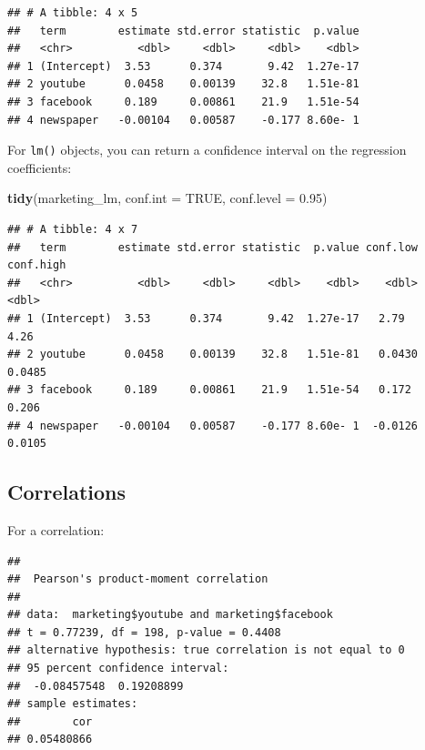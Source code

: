 \documentclass[
]{book}
\newenvironment{Shaded}{\begin{snugshade}}{\end{snugshade}}
\newcommand{\AttributeTok}[1]{\textcolor[rgb]{0.13,0.29,0.53}{#1}}
\newcommand{\ConstantTok}[1]{\textcolor[rgb]{0.56,0.35,0.01}{#1}}
\newcommand{\FloatTok}[1]{\textcolor[rgb]{0.00,0.00,0.81}{#1}}
\newcommand{\FunctionTok}[1]{\textcolor[rgb]{0.13,0.29,0.53}{\textbf{#1}}}
\newcommand{\NormalTok}[1]{#1}
\newcommand{\OtherTok}[1]{\textcolor[rgb]{0.56,0.35,0.01}{#1}}
\newcommand{\SpecialCharTok}[1]{\textcolor[rgb]{0.81,0.36,0.00}{\textbf{#1}}}
\begin{document}
\begin{verbatim}
## # A tibble: 4 x 5
##   term        estimate std.error statistic  p.value
##   <chr>          <dbl>     <dbl>     <dbl>    <dbl>
## 1 (Intercept)  3.53      0.374       9.42  1.27e-17
## 2 youtube      0.0458    0.00139    32.8   1.51e-81
## 3 facebook     0.189     0.00861    21.9   1.51e-54
## 4 newspaper   -0.00104   0.00587    -0.177 8.60e- 1
\end{verbatim}

For \texttt{lm()} objects, you can return a confidence interval on the regression coefficients:

\begin{Shaded}
\begin{Highlighting}[]
\FunctionTok{tidy}\NormalTok{(marketing\_lm, }\AttributeTok{conf.int =} \ConstantTok{TRUE}\NormalTok{, }\AttributeTok{conf.level =} \FloatTok{0.95}\NormalTok{)}
\end{Highlighting}
\end{Shaded}

\begin{verbatim}
## # A tibble: 4 x 7
##   term        estimate std.error statistic  p.value conf.low conf.high
##   <chr>          <dbl>     <dbl>     <dbl>    <dbl>    <dbl>     <dbl>
## 1 (Intercept)  3.53      0.374       9.42  1.27e-17   2.79      4.26  
## 2 youtube      0.0458    0.00139    32.8   1.51e-81   0.0430    0.0485
## 3 facebook     0.189     0.00861    21.9   1.51e-54   0.172     0.206 
## 4 newspaper   -0.00104   0.00587    -0.177 8.60e- 1  -0.0126    0.0105
\end{verbatim}

\hypertarget{correlations-1}{%
\subsection{Correlations}\label{correlations-1}}

For a correlation:

\begin{Shaded}
\end{Shaded}

\begin{verbatim}
## 
##  Pearson's product-moment correlation
## 
## data:  marketing$youtube and marketing$facebook
## t = 0.77239, df = 198, p-value = 0.4408
## alternative hypothesis: true correlation is not equal to 0
## 95 percent confidence interval:
##  -0.08457548  0.19208899
## sample estimates:
##        cor 
## 0.05480866
\end{verbatim}
\end{document}
